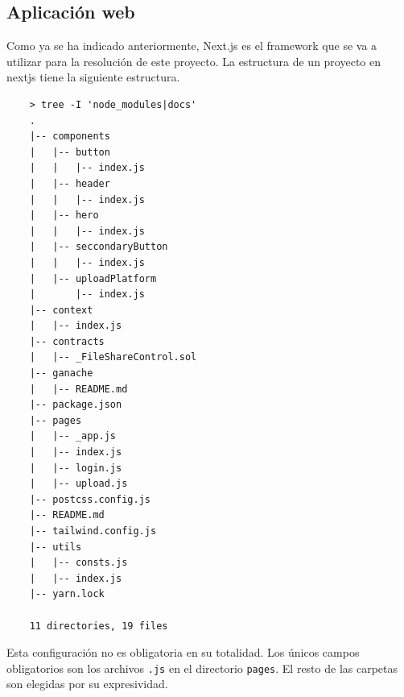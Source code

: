 \subsection{Aplicación web}
Como ya se ha indicado anteriormente, Next.js \cite{web:next.js} es el framework que se va a utilizar para la resolución de este proyecto.
La estructura de un proyecto en nextjs tiene la siguiente estructura.
\begin{lstlisting}
    > tree -I 'node_modules|docs'
    .
    |-- components
    |   |-- button
    |   |   |-- index.js
    |   |-- header
    |   |   |-- index.js
    |   |-- hero
    |   |   |-- index.js
    |   |-- seccondaryButton
    |   |   |-- index.js
    |   |-- uploadPlatform
    |       |-- index.js
    |-- context
    |   |-- index.js
    |-- contracts
    |   |-- _FileShareControl.sol
    |-- ganache
    |   |-- README.md
    |-- package.json
    |-- pages
    |   |-- _app.js
    |   |-- index.js
    |   |-- login.js
    |   |-- upload.js
    |-- postcss.config.js
    |-- README.md
    |-- tailwind.config.js
    |-- utils
    |   |-- consts.js
    |   |-- index.js
    |-- yarn.lock

    11 directories, 19 files
\end{lstlisting}
Esta configuración no es obligatoria en su totalidad. Los únicos campos obligatorios son los archivos \verb|.js| en el directorio \verb|pages|.
El resto de las carpetas son elegidas por su expresividad.

